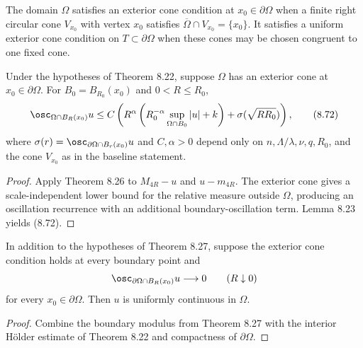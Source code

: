 \begin{definition}
\label{gt-def-8-exterior-cone-condition}
The domain $\Omega$ satisfies an exterior cone condition at
$x_0\in\partial\Omega$ when a finite right circular cone $V_{x_0}$ with vertex
$x_0$ satisfies $\overline\Omega\cap V_{x_0}=\{x_0\}$. It satisfies a uniform
exterior cone condition on $T\subset\partial\Omega$ when these cones may be
chosen congruent to one fixed cone.
\end{definition}

\begin{theorem}
\label{gt-thm-8-27-boundary-oscillation}
Under the hypotheses of Theorem 8.22, suppose $\Omega$ has an exterior cone at
$x_0\in\partial\Omega$. For $B_0=B_{R_0}(x_0)$ and $0<R\leq R_0$,
\begin{equation}
\osc_{\Omega\cap B_R(x_0)}u
\leq C\left(R^\alpha
\left(R_0^{-\alpha}\sup_{\Omega\cap B_0}|u|+k\right)
+\sigma(\sqrt{RR_0})\right),
\tag{8.72}
\end{equation}
where $\sigma(r)=\osc_{\partial\Omega\cap B_r(x_0)}u$ and $C,\alpha>0$
depend only on $n,\Lambda/\lambda,\nu,q,R_0$, and the cone $V_{x_0}$ as in
the baseline statement.
\end{theorem}
\begin{proof}
\sketch Apply Theorem 8.26 to $M_{4R}-u$ and $u-m_{4R}$. The exterior cone gives
a scale-independent lower bound for the relative measure outside $\Omega$,
producing an oscillation recurrence with an additional boundary-oscillation
term. Lemma 8.23 yields (8.72).
\end{proof}

\begin{corollary}
\label{gt-cor-8-28-uniform-boundary-continuity}
In addition to the hypotheses of Theorem 8.27, suppose the exterior cone
condition holds at every boundary point and
\[
\osc_{\partial\Omega\cap B_R(x_0)}u\longrightarrow0
\qquad(R\downarrow0)
\]
for every $x_0\in\partial\Omega$. Then $u$ is uniformly continuous in $\Omega$.
\end{corollary}
\begin{proof}
\sketch Combine the boundary modulus from Theorem 8.27 with the interior
H\"older estimate of Theorem 8.22 and compactness of $\partial\Omega$.
\end{proof}

